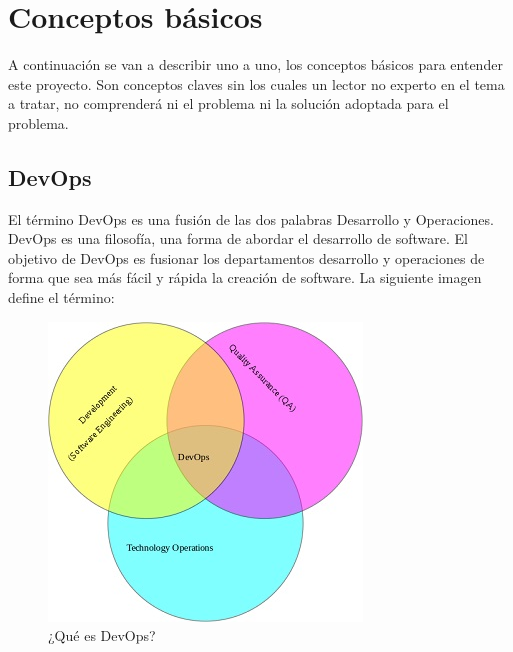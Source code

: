\clearpage 

\section{Conceptos básicos}
		\begin{text}
			A continuación se van a describir uno a uno, los conceptos básicos para entender este proyecto. Son conceptos claves sin los cuales un lector no experto en el tema a tratar, no comprenderá ni el problema ni la solución adoptada para el problema.
		\end{text}
	\subsection{DevOps}
		\begin{text}
			El término DevOps es una fusión de las dos palabras Desarrollo y Operaciones. DevOps es una filosofía, una forma de abordar el desarrollo de software. El objetivo de DevOps es fusionar los departamentos desarrollo y operaciones de forma que sea más fácil y rápida la creación de software. La siguiente imagen define el término:
			
			\begin{figure}[!hbt]
				\centering
				\includegraphics[scale=0.75]{imagenes/Introduccion/Conceptos_Basicos/devops.jpg}
				\caption[¿Qué es DevOps?]{¿Qué es DevOps? \cite{WhatIsDe1:online}}
				\label{termino_devops}
			\end{figure}
		\end{text}
	
	\clearpage 
	
